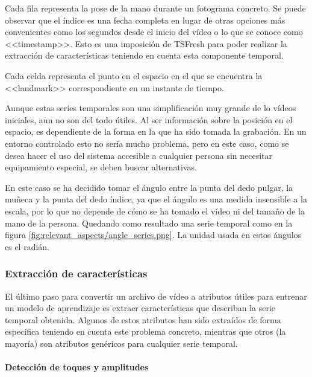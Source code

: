 
Cada fila representa la pose de la mano durante un fotograma concreto. Se puede
observar que el índice es una fecha completa en lugar de otras opciones más
convenientes como los segundos desde el inicio del vídeo o lo que se conoce como
<<timestamp>>. Esto es una imposición de TSFresh para poder realizar la
extracción de características teniendo en cuenta esta componente temporal.

Cada celda representa el punto en el espacio en el que se encuentra la
<<landmark>> correspondiente en un instante de tiempo.

Aunque estas series temporales son una simplificación muy grande de lo vídeos
iniciales, aun no son del todo útiles. Al ser información sobre la posición en
el espacio, es dependiente de la forma en la que ha sido tomada la grabación. En
un entorno controlado esto no sería mucho problema, pero en este caso, como se
desea hacer el uso del sistema accesible a cualquier persona sin necesitar
equipamiento especial, se deben buscar alternativas.

En este caso se ha decidido tomar el ángulo entre la punta del dedo pulgar, la
muñeca y la punta del dedo índice, ya que el ángulo es una medida insensible a
la escala, por lo que no depende de cómo se ha tomado el vídeo ni del tamaño de
la mano de la persona. Quedando como resultado una serie temporal como en la
figura \ref{fig:relevant_aspects/angle_series.png}. La unidad usada en estos
ángulos es el radián.


\subsubsection{Extracción de características}

El último paso para convertir un archivo de vídeo a atributos útiles para
entrenar un modelo de aprendizaje es extraer características que describan la
serie temporal obtenida. Algunos de estos atributos han sido extraídos de forma
específica teniendo en cuenta este problema concreto, mientras que otros (la
mayoría) son atributos genéricos para cualquier serie temporal.

\paragraph{Detección de toques y amplitudes}

